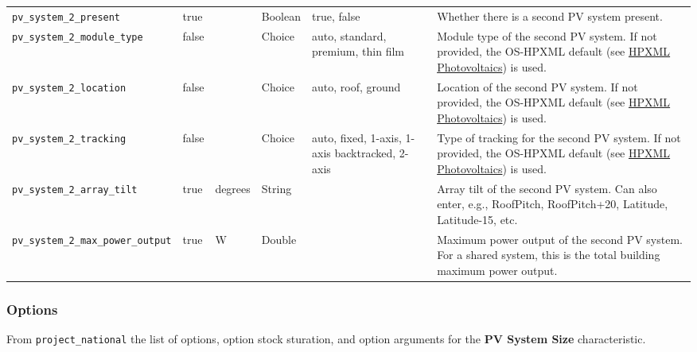 \begin{longtable}[]{@{}llllll@{}}
\texttt{pv\_system\_2\_present} & true & & Boolean & true, false &
Whether there is a second PV system present. \\
\texttt{pv\_system\_2\_module\_type} & false & & Choice & auto,
standard, premium, thin film & Module type of the second PV system. If
not provided, the OS-HPXML default (see
\href{https://openstudio-hpxml.readthedocs.io/en/v1.7.0/workflow_inputs.html\#hpxml-photovoltaics}{HPXML
Photovoltaics}) is used. \\
\texttt{pv\_system\_2\_location} & false & & Choice & auto, roof, ground
& Location of the second PV system. If not provided, the OS-HPXML
default (see
\href{https://openstudio-hpxml.readthedocs.io/en/v1.7.0/workflow_inputs.html\#hpxml-photovoltaics}{HPXML
Photovoltaics}) is used. \\
\texttt{pv\_system\_2\_tracking} & false & & Choice & auto, fixed,
1-axis, 1-axis backtracked, 2-axis & Type of tracking for the second PV
system. If not provided, the OS-HPXML default (see
\href{https://openstudio-hpxml.readthedocs.io/en/v1.7.0/workflow_inputs.html\#hpxml-photovoltaics}{HPXML
Photovoltaics}) is used. \\
\texttt{pv\_system\_2\_array\_tilt} & true & degrees & String & & Array
tilt of the second PV system. Can also enter, e.g., RoofPitch,
RoofPitch+20, Latitude, Latitude-15, etc. \\
\texttt{pv\_system\_2\_max\_power\_output} & true & W & Double & &
Maximum power output of the second PV system. For a shared system, this
is the total building maximum power output. \\
\end{longtable}

\subsubsection{Options}\label{options-132}

From \texttt{project\_national} the list of options, option stock
sturation, and option arguments for the \textbf{PV System Size}
characteristic.

